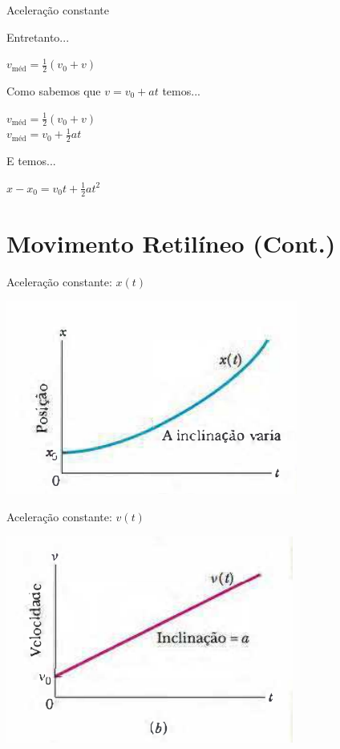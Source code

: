 \documentclass[xcolor=dvipsnames,table]{beamer}
\begin{document}
		\begin{frame}{Aceleração constante}
		\begin{block}{Entretanto...}
			\begin{center}
				$v_{\mbox{méd}} = \frac{1}{2}(v_0 + v)$
			\end{center}
			Como sabemos que $v = v_0 + at$ temos...
			\begin{center}
				$v_{\mbox{méd}} = \frac{1}{2}(v_0 + v)$ \\
				$v_{\mbox{méd}} = v_0 + \frac{1}{2} at$
			\end{center}
			E temos...
			\begin{center}
				$x - x_0 = v_0t + \frac{1}{2}at^2$
			\end{center}
		\end{block}
	\end{frame}

	\section{Movimento Retilíneo (Cont.)}

	\begin{frame}{Aceleração constante: $x(t)$}
		\begin{center}
			\includegraphics[scale=0.7]{images/fig2-8a}
		\end{center}
	\end{frame}

	\begin{frame}{Aceleração constante: $v(t)$}
		\begin{center}
			\includegraphics[scale=0.7]{images/fig2-8b}
		\end{center}
	\end{frame}
\end{document}
